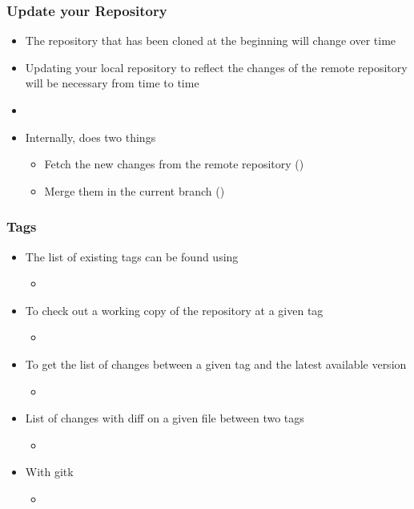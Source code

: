 \begin{frame}
  \frametitle{Update your Repository}
  \begin{itemize}
  \item The repository that has been cloned at the beginning will
    change over time
  \item Updating your local repository to reflect the changes of the
    remote repository will be necessary from time to time
  \item {}
  \item Internally, does two things
    \begin{itemize}
    \item Fetch the new changes from the remote repository
      ()
    \item Merge them in the current branch ()
    \end{itemize}
  \end{itemize}
\end{frame}

\begin{frame}
  \frametitle{Tags}
  \begin{itemize}
  \item The list of existing tags can be found using
    \begin{itemize}
    \item {}
    \end{itemize}
  \item To check out a working copy of the repository at a given tag
    \begin{itemize}
    \item {}
    \end{itemize}
  \item To get the list of changes between a given tag and the latest
    available version
    \begin{itemize}
    \item {}
    \end{itemize}
  \item List of changes with diff on a given file between two tags
    \begin{itemize}
    \item {}
    \end{itemize}
  \item With gitk
    \begin{itemize}
    \item {}
    \end{itemize}
  \end{itemize}
\end{frame}

